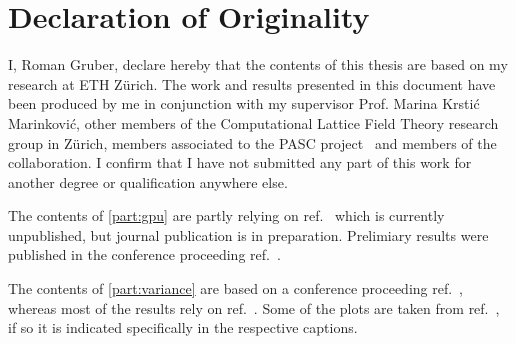 \begingroup
\let\clearpage\relax
\let\cleardoublepage\relax
\let\cleardoublepage\relax

\chapter*{Declaration of Originality}

I, Roman Gruber, declare hereby that the contents of this thesis are based on my research at ETH Zürich.
The work and results presented in this document have been produced by me in conjunction with my supervisor Prof. Marina Krstić Marinković, other members of the Computational Lattice Field Theory research group in Zürich, members associated to the PASC project~\cite{online:pasc2021} and members of the \RCstar collaboration.
I confirm that I have not submitted any part of this work for another degree or qualification anywhere else.

The contents of \cref{part:gpu} are partly relying on ref.~ which is currently unpublished, but journal publication is in preparation.
Prelimiary results were published in the conference proceeding ref.~.

The contents of \cref{part:variance} are based on a conference proceeding ref.~, whereas most of the results rely on ref.~.
Some of the plots are taken from ref.~, if so it is indicated specifically in the respective captions.

\endgroup
